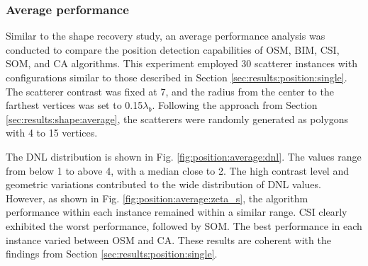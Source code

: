 \documentclass{IEEEtran}
\begin{document}
			\subsubsection{Average performance}\label{sec:results:position:benchmark}

                Similar to the shape recovery study, an average performance analysis was conducted to compare the position detection capabilities of OSM, BIM, CSI, SOM, and CA algorithms. This experiment employed 30 scatterer instances with configurations similar to those described in Section \ref{sec:results:position:single}. The scatterer contrast was fixed at 7, and the radius from the center to the farthest vertices was set to 0.15$\lambda_b$. Following the approach from Section \ref{sec:results:shape:average}, the scatterers were randomly generated as polygons with 4 to 15 vertices.

                The DNL distribution is shown in Fig. \ref{fig:position:average:dnl}. The values range from below 1 to above 4, with a median close to 2. The high contrast level and geometric variations contributed to the wide distribution of DNL values. However, as shown in Fig. \ref{fig:position:average:zeta_s}, the algorithm performance within each instance remained within a similar range. CSI clearly exhibited the worst performance, followed by SOM. The best performance in each instance varied between OSM and CA. These results are coherent with the findings from Section \ref{sec:results:position:single}.
\end{document}
